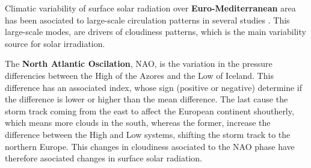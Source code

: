 

Climatic variability of surface solar radiation over \textbf{Euro-Mediterranean} area has been asociated to large-scale circulation patterns in several studies \cite*{Jerez2013a, Chiacchio2010, Sanchez-Lorenzo2009, Pozo-Vazquez2004}. This large-scale modes, are drivers of cloudiness patterns, which is the main variability source for solar irradiation.

The \textbf{North Atlantic Oscilation}, NAO, is the variation in the pressure differencies between the High of the Azores and the Low of Iceland. This difference has an associated index, whose sign (positive or negative) determine if the difference is lower or higher than the mean difference. The last cause the storm track coming from the east to affect the European continent shoutherly, which means more clouds in the south, whereas the former, increase the difference between the High and Low systems, shifting the storm track to the northern Europe. This changes in cloudiness asociated to the NAO phase have therefore asociated changes in surface solar radiation.

